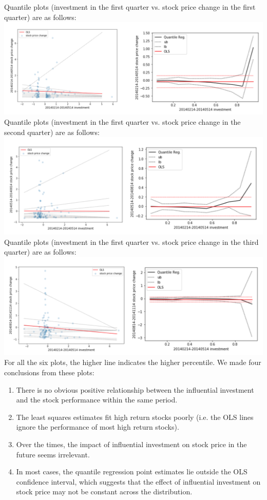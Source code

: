 \documentclass{article}
\begin{document}
\begin{multicols}{2}
Quantile plots (investment in the first quarter vs.  stock price change in the first quarter) are as follows:\\
 \includegraphics[scale = 0.3]{quantile1.png}\\
Quantile plots (investment in the first quarter vs.  stock price change in the second quarter) are as follows:\\
  \includegraphics[scale = 0.3]{quantile2.png}\\
Quantile plots (investment in the first quarter vs.  stock price change in the third quarter) are as follows:\\
   \includegraphics[scale = 0.3]{quantile3.png}\\
 For all the six plots, the higher line indicates the higher percentile.  We made four conclusions from these plots:\\
\begin{enumerate}
\item There is no obvious positive relationship between the influential investment  and the stock performance within the same period.
\item The least squares estimates fit high return stocks poorly (i.e. the OLS lines ignore the performance of most high return stocks).
\item Over the times, the impact of influential investment on stock price in the future seems irrelevant.
\item In most cases, the quantile regression point estimates lie outside the OLS confidence interval, which suggests that the effect of influential investment on stock price may not be constant across the distribution.
\end{enumerate}
 

\end{multicols}
\end{document}
